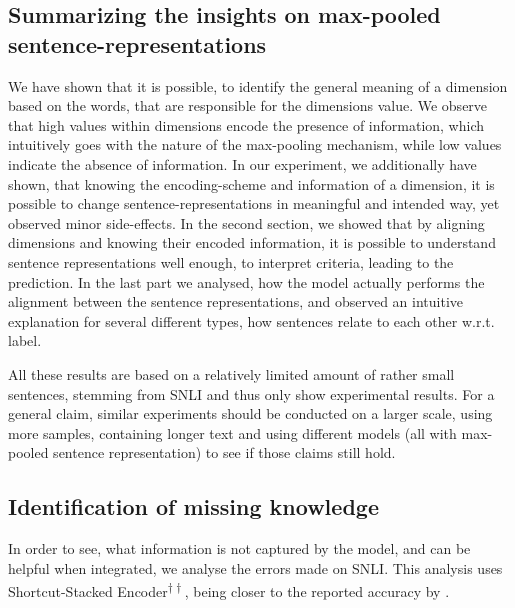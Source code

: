 \subsection{Summarizing the insights on max-pooled sentence-representations}
We have shown that it is possible, to identify the general meaning of a dimension based on the words, that are responsible for the dimensions value. We observe that high values within dimensions encode the presence of information, which intuitively goes with the nature of the max-pooling mechanism, while low values indicate the absence of information. In our experiment, we additionally have shown, that knowing the encoding-scheme and information of a dimension, it is possible to change sentence-representations in meaningful and intended way, yet observed minor side-effects. In the second section, we showed that by aligning dimensions and knowing their encoded information, it is possible to understand sentence representations well enough, to interpret criteria, leading to the prediction. In the last part we analysed, how the model actually performs the alignment between the sentence representations, and observed an intuitive explanation for several different types, how sentences relate to each other w.r.t. label.
\newline

\noindent
All these results are based on a relatively limited amount of rather small sentences, stemming from \ac{SNLI} and thus only show experimental results. For a general claim, similar experiments should be conducted on a larger scale, using more samples, containing longer text and using different models (all with max-pooled sentence representation) to see if those claims still hold. 
\subsection{Identification of missing knowledge}
In order to see, what information is not captured by the model, and can be helpful when integrated, we analyse the errors made on \ac{SNLI}. This analysis uses Shortcut-Stacked Encoder\textsuperscript{$\dagger\dagger$}, being closer to the reported accuracy by \cite{nie2017shortcut}. 
